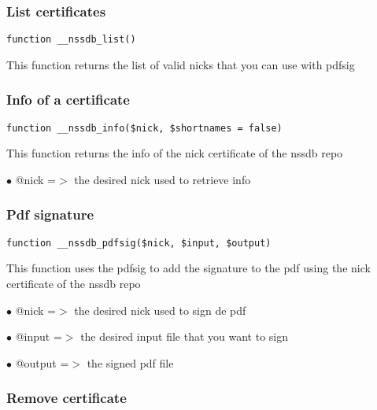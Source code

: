 \documentclass[a4paper]{article}
\begin{document}
\hypertarget{toc14}{}
\subsubsection{List certificates}

\begin{lstlisting}
function __nssdb_list()
\end{lstlisting}

This function returns the list of valid nicks that you can use with pdfsig

\hypertarget{toc15}{}
\subsubsection{Info of a certificate}

\begin{lstlisting}
function __nssdb_info($nick, $shortnames = false)
\end{lstlisting}

This function returns the info of the nick certificate of the nssdb repo

\begin{compactitem}
\item[\color{myblue}$\bullet$] @nick =$>$ the desired nick used to retrieve info
\end{compactitem}

\hypertarget{toc16}{}
\subsubsection{Pdf signature}

\begin{lstlisting}
function __nssdb_pdfsig($nick, $input, $output)
\end{lstlisting}

This function uses the pdfsig to add the signature to the pdf using the nick
certificate of the nssdb repo

\begin{compactitem}
\item[\color{myblue}$\bullet$] @nick   =$>$ the desired nick used to sign de pdf
\item[\color{myblue}$\bullet$] @input  =$>$ the desired input file that you want to sign
\item[\color{myblue}$\bullet$] @output =$>$ the signed pdf file
\end{compactitem}

\hypertarget{toc17}{}
\subsubsection{Remove certificate}
\end{document}
